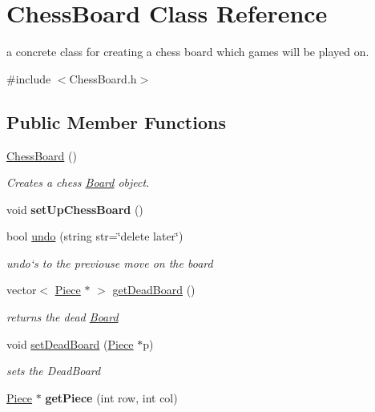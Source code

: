 \hypertarget{classChessBoard}{
\section{ChessBoard Class Reference}
\label{classChessBoard}
}


a concrete class for creating a chess board which games will be played on.  


{\ttfamily \#include $<$ChessBoard.h$>$}\subsection*{Public Member Functions}
\begin{DoxyCompactItemize}
\item 
\hypertarget{classChessBoard_a6585395bb4f064b4f4566df1c7fa4276}{
\hyperlink{classChessBoard_a6585395bb4f064b4f4566df1c7fa4276}{ChessBoard} ()}
\label{classChessBoard_a6585395bb4f064b4f4566df1c7fa4276}

\begin{DoxyCompactList}\small\item\em Creates a chess \hyperlink{classBoard}{Board} object. \item\end{DoxyCompactList}\item 
\hypertarget{classChessBoard_a76c7d0672aac47763c93414169170393}{
void {\bfseries setUpChessBoard} ()}
\label{classChessBoard_a76c7d0672aac47763c93414169170393}

\item 
bool \hyperlink{classChessBoard_a88cc4b18d8ff152040bbf19f3938f263}{undo} (string str=\char`\"{}delete later\char`\"{})
\begin{DoxyCompactList}\small\item\em undo`s to the previouse move on the board \item\end{DoxyCompactList}\item 
vector$<$ \hyperlink{classPiece}{Piece} $\ast$ $>$ \hyperlink{classChessBoard_a213f4676d46d0c938cdf4cbdf9e89fc6}{getDeadBoard} ()
\begin{DoxyCompactList}\small\item\em returns the dead \hyperlink{classBoard}{Board} \item\end{DoxyCompactList}\item 
void \hyperlink{classChessBoard_a3d378451fd54b5f335d32143a413afaf}{setDeadBoard} (\hyperlink{classPiece}{Piece} $\ast$p)
\begin{DoxyCompactList}\small\item\em sets the DeadBoard \item\end{DoxyCompactList}\item 
\hypertarget{classChessBoard_ace11797096bfed610192baf5a26631ab}{
\hyperlink{classPiece}{Piece} $\ast$ {\bfseries getPiece} (int row, int col)}
\label{classChessBoard_ace11797096bfed610192baf5a26631ab}


\end{DoxyCompactItemize}
